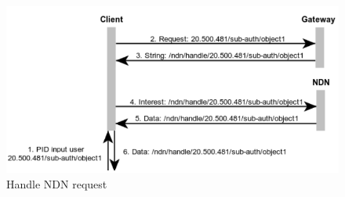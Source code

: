 \begin{figure}[H]
\includegraphics[scale=0.75]{Images/ndn_req.png}
\caption{Handle NDN request}
\label{fig:seq_ndn}
\end{figure}